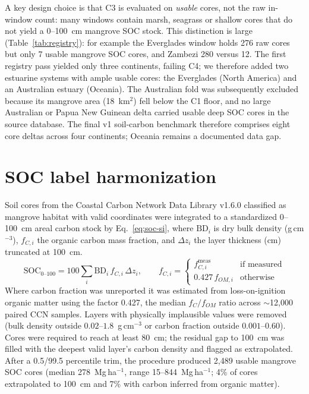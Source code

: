 \documentclass[10pt]{extarticle}
\begin{document}
A key design choice is that C3 is evaluated on \emph{usable} cores, not the raw in-window
count: many windows contain marsh, seagrass or shallow cores that do not yield a
0--100~cm mangrove SOC stock. This distinction is large (Table~\ref{tab:registry}): for
example the Everglades window holds 276 raw cores but only 7 usable mangrove SOC cores,
and Zambezi 280 versus 12. The first registry pass yielded only three continents, failing
C4; we therefore added two estuarine systems with ample usable cores: the Everglades (North America) and an Australian estuary (Oceania). The Australian fold was subsequently
excluded because its mangrove area (18~km$^2$) fell below the C1 floor, and no large
Australian or Papua New Guinean delta carried usable deep SOC cores in the source
database. The final v1 soil-carbon benchmark therefore comprises eight core deltas across
four continents; Oceania remains a documented data gap.

\begin{table}[h]
\centering
\caption{Full candidate delta registry: mangrove area (GMW v3, 2020, equal-area), usable
mangrove SOC cores, raw in-window cores (any habitat), and assigned role. Auto-generated
from \texttt{data/processed/delta\_registry.csv}.}
\label{tab:registry}

\end{table}

\section{SOC label harmonization}
\label{si:soc}
Soil cores from the Coastal Carbon Network Data Library v1.6.0 classified as mangrove
habitat with valid coordinates were integrated to a standardized 0--100~cm areal carbon
stock by Eq.~\ref{eq:soc-si}, where $\mathrm{BD}_i$ is dry bulk density
(g\,cm$^{-3}$), $f_{C,i}$ the organic carbon mass fraction, and $\Delta z_i$ the layer
thickness (cm) truncated at 100~cm.
\begin{equation}
\mathrm{SOC}_{0\text{--}100} = 100 \sum_i \mathrm{BD}_i\, f_{C,i}\, \Delta z_i,
\qquad f_{C,i} = \begin{cases} f_{C,i}^{\text{meas}} & \text{if measured} \\
0.427\, f_{OM,i} & \text{otherwise} \end{cases}
\label{eq:soc-si}
\end{equation}
Where carbon fraction was unreported it was estimated from loss-on-ignition organic
matter using the factor 0.427, the median $f_C/f_{OM}$ ratio across $\sim$12{,}000
paired CCN samples. Layers with physically implausible values were removed (bulk density
outside $0.02$--$1.8$~g\,cm$^{-3}$ or carbon fraction outside $0.001$--$0.60$). Cores
were required to reach at least 80~cm; the residual gap to 100~cm was filled with the
deepest valid layer's carbon density and flagged as extrapolated. After a 0.5/99.5
percentile trim, the procedure produced 2{,}489 usable mangrove SOC cores (median
278~Mg\,ha$^{-1}$, range 15--844~Mg\,ha$^{-1}$; 4\% of cores extrapolated to 100~cm and
7\% with carbon inferred from organic matter).
\end{document}
